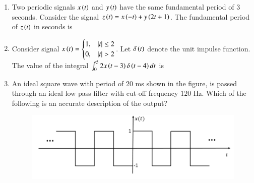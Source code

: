 \documentclass[journal,12pt,onecolumn]{IEEEtran}
\theoremstyle{remark}
\begin{document}
\begin{enumerate}
    \item Two periodic signals $x\left(t\right)$ and $y\left(t\right)$ have the same fundamental period of $3$ seconds. Consider the signal $z\left(t\right)=x\left(-t\right)+y\left(2t+1\right)$. The fundamental period of $z\left(t\right)$ in seconds is
    
    \hfill{}
    \begin{enumerate}
    \end{enumerate}

    \item Consider signal $x\brak{t}=\begin{cases}1, & |t| \le 2\\ 0, & |t|>2\end{cases}$. Let $\delta\left(t\right)$ denote the unit impulse  function. The value of the integral $\int_{0}^{5}2x\left(t-3\right)\delta\left(t-4\right)dt$ is
    
    \hfill{}
    \begin{enumerate}
    \end{enumerate}

    \item An ideal square wave with period of $20$ ms shown in the figure, is passed through an ideal low pass filter with cut-off frequency $120$ Hz. Which of the following is an accurate description of the output?
    \begin{figure}[H]
        \centering
        \includegraphics[width=0.8\columnwidth]{q11.png}
        \caption*{}
        \label{fig:q11}
    \end{figure}
    

\end{enumerate}
\end{document}
